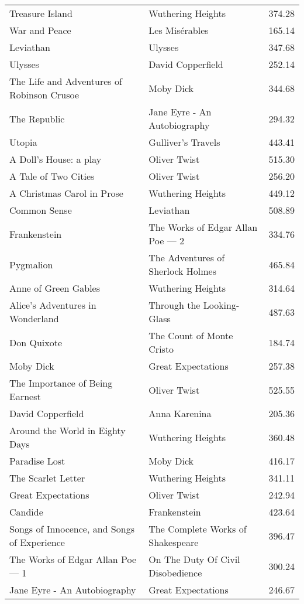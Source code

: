 \documentclass{article}
\begin{document}
\begin{table}[h]
\begin{center}
\begin{tabular}{ | l | l | l |}
    Treasure Island & Wuthering Heights & 374.28 \\
    War and Peace & Les Misérables & 165.14 \\
    Leviathan & Ulysses & 347.68 \\
    Ulysses & David Copperfield & 252.14 \\
    The Life and Adventures of Robinson Crusoe & Moby Dick & 344.68 \\
    The Republic & Jane Eyre - An Autobiography & 294.32 \\
    Utopia & Gulliver's Travels & 443.41 \\
    A Doll's House: a play & Oliver Twist & 515.30 \\
    A Tale of Two Cities & Oliver Twist & 256.20 \\
    A Christmas Carol in Prose & Wuthering Heights & 449.12 \\
    Common Sense & Leviathan & 508.89 \\
    Frankenstein & The Works of Edgar Allan Poe — 2 & 334.76 \\
    Pygmalion & The Adventures of Sherlock Holmes & 465.84 \\
    Anne of Green Gables & Wuthering Heights & 314.64 \\
    Alice's Adventures in Wonderland & Through the Looking-Glass & 487.63 \\
    Don Quixote & The Count of Monte Cristo & 184.74 \\
    Moby Dick & Great Expectations & 257.38 \\
    The Importance of Being Earnest & Oliver Twist & 525.55 \\
    David Copperfield & Anna Karenina & 205.36 \\
    Around the World in Eighty Days & Wuthering Heights & 360.48 \\
    Paradise Lost & Moby Dick & 416.17 \\
    The Scarlet Letter & Wuthering Heights & 341.11 \\
    Great Expectations & Oliver Twist & 242.94 \\
    Candide & Frankenstein & 423.64 \\
    Songs of Innocence, and Songs of Experience & The Complete Works of Shakespeare & 396.47 \\
    The Works of Edgar Allan Poe — 1 & On The Duty Of Civil Disobedience & 300.24 \\
    Jane Eyre - An Autobiography & Great Expectations & 246.67 \\

\end{tabular}
\end{center}
\end{table}
\end{document}
